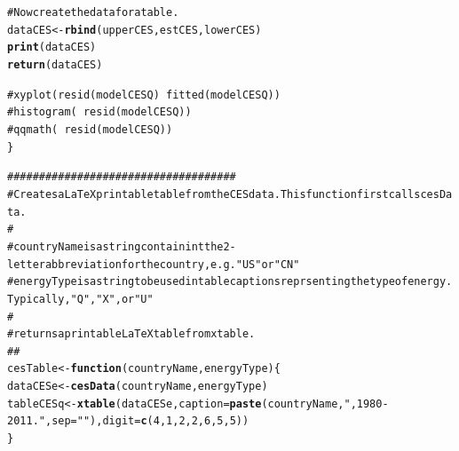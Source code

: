 \documentclass[preprint,authoryear,12pt]{elsarticle}\usepackage{graphicx, color}
\makeatletter
\newcommand{\hlfunctioncall}[1]{\textcolor[rgb]{0.501960784313725,0,0.329411764705882}{\textbf{#1}}}%
\newcommand{\hlstring}[1]{\textcolor[rgb]{0.6,0.6,1}{#1}}%
\newcommand{\hlcomment}[1]{\textcolor[rgb]{0.180392156862745,0.6,0.341176470588235}{#1}}%
\newenvironment{kframe}{%
 \def\at@end@of@kframe{}%
 \ifinner\ifhmode%
  \def\at@end@of@kframe{\end{minipage}}%
  \begin{minipage}{\columnwidth}%
 \fi\fi%
 \def\FrameCommand##1{\hskip\@totalleftmargin \hskip-\fboxsep
 \colorbox{shadecolor}{##1}\hskip-\fboxsep
     \hskip-\linewidth \hskip-\@totalleftmargin \hskip\columnwidth}%
 \MakeFramed {\advance\hsize-\width
   \@totalleftmargin\z@ \linewidth\hsize
   \@setminipage}}%
 {\par\unskip\endMakeFramed%
 \at@end@of@kframe}
\newenvironment{knitrout}{}{} %
\makeatother
\begin{document}
\begin{knitrout}
\begin{kframe}
\begin{alltt}
\hlcomment{  # Now create the data for a table.}
  dataCES <- \hlfunctioncall{rbind}(upperCES, estCES, lowerCES)
  \hlfunctioncall{print}(dataCES)
  \hlfunctioncall{return}(dataCES)

\hlcomment{  #xyplot( resid(modelCESQ) ~ fitted(modelCESQ) )}
\hlcomment{  #histogram( ~resid(modelCESQ) )}
\hlcomment{  #qqmath( ~resid(modelCESQ) )}
\}

\hlcomment{####################################}
\hlcomment{# Creates a LaTeX printable table from the CES data. This function first calls cesData.}
\hlcomment{#}
\hlcomment{# countryName is a string containint the 2-letter abbreviation for the country, e.g. "US" or "CN"}
\hlcomment{# energyType is a string to be used in table captions reprsenting the type of energy. Typically, "Q", "X", or "U"}
\hlcomment{#}
\hlcomment{# returns a printable LaTeX table from xtable.}
\hlcomment{##}
cesTable <- \hlfunctioncall{function}(countryName, energyType)\{
  dataCESe <- \hlfunctioncall{cesData}(countryName, energyType)
  tableCESq <- \hlfunctioncall{xtable}(dataCESe, caption=\hlfunctioncall{paste}(countryName, \hlstring{", 1980-2011."}, sep=\hlstring{""}), digit = \hlfunctioncall{c}(4, 1, 2, 2, 6, 5, 5))
\}
\end{alltt}
\end{kframe}
\end{knitrout}
\end{document}
